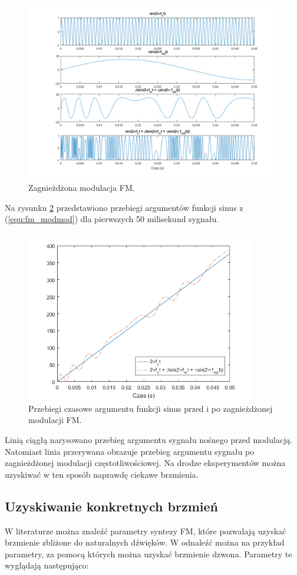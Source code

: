 \begin{figure}[H]
	\centering
	\includegraphics[width=14cm]{grafiki/fm_modmod}
	\captionsetup{justification=centering}
	\caption{Zagnieżdżona modulacja FM.}
	\label{rys:fm_modmod}
\end{figure}
Na rysunku \ref{rys:fm_arg2} przedstawiono przebiegi argumentów funkcji sinus z (\ref{equ:fm_modmod}) dla pierwszych 50 milisekund sygnału.
\begin{figure}[H]
	\centering
	\includegraphics[width=10cm]{grafiki/fm_arg2}
	\captionsetup{justification=centering}
	\caption{Przebiegi czasowe argumentu funkcji sinus przed i po zagnieżdżonej modulacji FM.}
	\label{rys:fm_arg2}
\end{figure}
Linią ciągłą narysowano przebieg argumentu sygnału nośnego przed modulacją. Natomiast linia przerywana obrazuje przebieg argumentu sygnału po zagnieżdżonej modulacji częstotliwościowej. Na drodze eksperymentów można uzyskiwać w ten sposób naprawdę ciekawe brzmienia.
\subsection{Uzyskiwanie konkretnych brzmień}
W literaturze można znaleźć parametry syntezy FM, które pozwalają uzyskać brzmienie zbliżone do naturalnych dźwięków. W \cite{chowning} odnaleźć można na przykład parametry, za pomocą których można uzyskać brzmienie dzwona. Parametry te wyglądają następująco:

